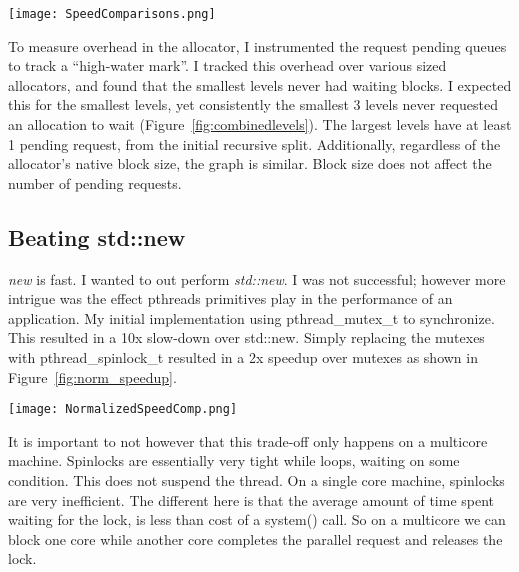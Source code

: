 \documentclass[12pt]{article}
\begin{document}
\begin{figure*}[h!]
    \begin{center}
        \texttt{[image: SpeedComparisons.png]}
        \caption{Raw Allocation performance.}
        \label{fig:speed}
    \end{center}
\end{figure*}

To measure overhead in the allocator, I instrumented the request pending queues
to track a ``high-water mark''. I tracked this overhead over various sized
allocators, and found that the smallest levels never had waiting blocks.
I expected this for the smallest levels, yet consistently the smallest 3 levels
never requested an allocation to wait (Figure~\ref{fig:combinedlevels}). The largest 
levels have at least 1 pending request, from the initial recursive split. Additionally, 
regardless of the allocator's native block size, the graph is similar.  Block
size does not affect the number of pending requests.

\subsection{Beating std::new}
{\em new} is fast. I wanted to out perform {\em std::new}. I was not successful; however
more intrigue was the effect pthreads primitives play in the performance of an
application. My initial implementation using pthread\_mutex\_t to synchronize.
This resulted in a 10x slow-down over std::new.  Simply replacing the mutexes
with pthread\_spinlock\_t resulted in a 2x speedup over mutexes as shown in
Figure~\ref{fig:norm_speedup}.  

\begin{figure*}[h!]
    \begin{center}
        \texttt{[image: NormalizedSpeedComp.png]}
        \caption{On a multicore machine, spinlocks result in better performance
        over mutexes}
        \label{fig:norm_speedup}
    \end{center}
\end{figure*}

It is important to not however that this trade-off only happens on a multicore
machine. Spinlocks are essentially very tight while loops, waiting on some
condition. This does not suspend the thread. On a single core machine, spinlocks
are very inefficient.  The different here is that the average amount of time spent
waiting for the lock, is less than cost of a system() call. So on a multicore we
can block one core while another core completes the parallel request and
releases the lock.
\end{document}
